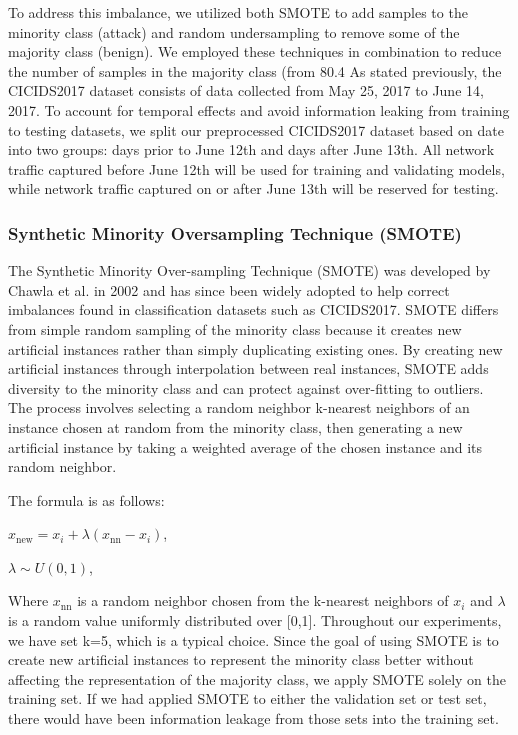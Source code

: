 To address this imbalance, we utilized both SMOTE to add samples to the minority class (attack) and random undersampling to remove some of the majority class (benign). We employed these techniques in combination to reduce the number of samples in the majority class (from 80.4%
As stated previously, the CICIDS2017 dataset consists of data collected from May 25, 2017 to June 14, 2017. To account for temporal effects and avoid information leaking from training to testing datasets, we split our preprocessed CICIDS2017 dataset based on date into two groups: days prior to June 12th and days after June 13th. All network traffic captured before June 12th will be used for training and validating models, while network traffic captured on or after June 13th will be reserved for testing.

\subsubsection{Synthetic Minority Oversampling Technique (SMOTE)}

The Synthetic Minority Over-sampling Technique (SMOTE) was developed by Chawla et al. in 2002 and has since been widely adopted to help correct imbalances found in classification datasets such as CICIDS2017. SMOTE differs from simple random sampling of the minority class because it creates new artificial instances rather than simply duplicating existing ones. By creating new artificial instances through interpolation between real instances, SMOTE adds diversity to the minority class and can protect against over-fitting to outliers. The process involves selecting a random neighbor k-nearest neighbors of an instance chosen at random from the minority class, then generating a new artificial instance by taking a weighted average of the chosen instance and its random neighbor.

The formula is as follows:

$x_\text{new} = x_i + \lambda(x_\text{nn} - x_i)$,

$\lambda \sim U(0,1)$,

Where $x_\text{nn}$ is a random neighbor chosen from the k-nearest neighbors of $x_i$ and $\lambda$ is a random value uniformly distributed over [0,1]. Throughout our experiments, we have set k=5, which is a typical choice. Since the goal of using SMOTE is to create new artificial instances to represent the minority class better without affecting the representation of the majority class, we apply SMOTE solely on the training set. If we had applied SMOTE to either the validation set or test set, there would have been information leakage from those sets into the training set.

